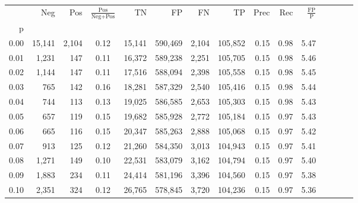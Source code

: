 \begin{tabular}{rrrcrrrrrrrrrrr}
\toprule
{} &     Neg &     Pos & $\frac{\text{Pos}}{\text{Neg}+\text{Pos}}$ &       TN &       FP &       FN &       TP &  Prec &   Rec & $\frac{\text{FP}}{\text{P}}$ \\
p    &         &         &                                            &          &          &          &          &       &       &                              \\
\midrule
0.00 &  15,141 &   2,104 &                                       0.12 &   15,141 &  590,469 &    2,104 &  105,852 &  0.15 &  0.98 &                         5.47 \\
0.01 &   1,231 &     147 &                                       0.11 &   16,372 &  589,238 &    2,251 &  105,705 &  0.15 &  0.98 &                         5.46 \\
0.02 &   1,144 &     147 &                                       0.11 &   17,516 &  588,094 &    2,398 &  105,558 &  0.15 &  0.98 &                         5.45 \\
0.03 &     765 &     142 &                                       0.16 &   18,281 &  587,329 &    2,540 &  105,416 &  0.15 &  0.98 &                         5.44 \\
0.04 &     744 &     113 &                                       0.13 &   19,025 &  586,585 &    2,653 &  105,303 &  0.15 &  0.98 &                         5.43 \\
0.05 &     657 &     119 &                                       0.15 &   19,682 &  585,928 &    2,772 &  105,184 &  0.15 &  0.97 &                         5.43 \\
0.06 &     665 &     116 &                                       0.15 &   20,347 &  585,263 &    2,888 &  105,068 &  0.15 &  0.97 &                         5.42 \\
0.07 &     913 &     125 &                                       0.12 &   21,260 &  584,350 &    3,013 &  104,943 &  0.15 &  0.97 &                         5.41 \\
0.08 &   1,271 &     149 &                                       0.10 &   22,531 &  583,079 &    3,162 &  104,794 &  0.15 &  0.97 &                         5.40 \\
0.09 &   1,883 &     234 &                                       0.11 &   24,414 &  581,196 &    3,396 &  104,560 &  0.15 &  0.97 &                         5.38 \\
0.10 &   2,351 &     324 &                                       0.12 &   26,765 &  578,845 &    3,720 &  104,236 &  0.15 &  0.97 &                         5.36 \\

\end{tabular}

